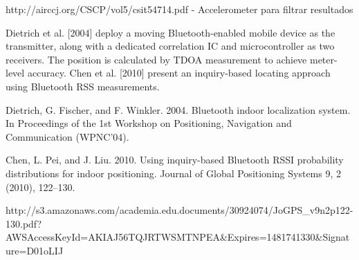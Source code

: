 http://airccj.org/CSCP/vol5/csit54714.pdf - Accelerometer para filtrar resultados




Dietrich et al. [2004] deploy a moving Bluetooth-enabled mobile device as
the transmitter, along with a dedicated correlation IC and microcontroller as two receivers.
The position is calculated by TDOA measurement to achieve meter-level accuracy.
Chen et al. [2010] present an inquiry-based locating approach using Bluetooth
RSS measurements.

Dietrich, G. Fischer, and F. Winkler. 2004. Bluetooth indoor localization system. In Proceedings of the 1st
Workshop on Positioning, Navigation and Communication (WPNC’04).

Chen, L. Pei, and J. Liu. 2010. Using inquiry-based Bluetooth RSSI probability distributions for indoor
positioning. Journal of Global Positioning Systems 9, 2 (2010), 122–130.

http://s3.amazonaws.com/academia.edu.documents/30924074/JoGPS_v9n2p122-130.pdf?AWSAccessKeyId=AKIAJ56TQJRTWSMTNPEA&Expires=1481741330&Signature=D01oLIJ%


